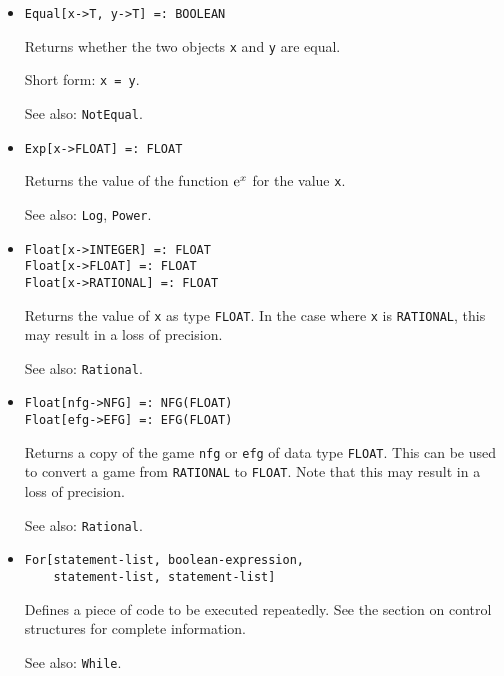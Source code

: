 \begin{itemize}
\item
\protect \large \begin{verbatim}
Equal[x->T, y->T] =: BOOLEAN
\end{verbatim}\normalsize

\bd
Returns whether the two objects \verb+x+ and \verb+y+ are
equal.
\item
[Short form:] \verb+x = y+.
\item
[See also:] {\tt NotEqual}.
\ed

\item
\protect \large \begin{verbatim}
Exp[x->FLOAT] =: FLOAT
\end{verbatim} \normalsize

\bd
Returns the value of the function ${\rm e}^{x}$ for the
value \verb+x+.
\item
[See also:] {\tt Log}, {\tt Power}.
\ed



\item
\protect \large \begin{verbatim}
Float[x->INTEGER] =: FLOAT
Float[x->FLOAT] =: FLOAT
Float[x->RATIONAL] =: FLOAT
\end{verbatim} \normalsize

\bd
Returns the value of \verb+x+ as type {\tt FLOAT}.
In the case where \verb+x+ is {\tt RATIONAL}, this may result in a loss
of precision.
\item
[See also:] {\tt Rational}.
\ed

\item
\protect \large \begin{verbatim}
Float[nfg->NFG] =: NFG(FLOAT)
Float[efg->EFG] =: EFG(FLOAT)
\end{verbatim} \normalsize

\bd
Returns a copy of the game \verb+nfg+ or \verb+efg+ of data type 
{\tt FLOAT}.  This can be used to convert a game from {\tt RATIONAL}
to {\tt FLOAT}.  Note that this may result in a loss of precision.  
\item
[See also:] {\tt Rational}.
\ed

\item
\protect \large \begin{verbatim}
For[statement-list, boolean-expression, 
    statement-list, statement-list]
\end{verbatim}\normalsize

\bd
Defines a piece of code to be executed repeatedly.  See the section
on control structures for complete information.
\item
[See also:] \verb+While+.
\ed


\end{itemize}
